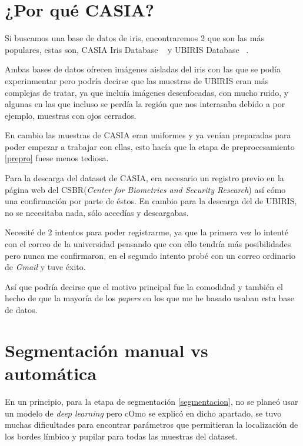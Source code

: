 
\section{¿Por qué CASIA?}

Si buscamos una base de datos de iris, encontraremos 2 que son las más populares, estas son, CASIA Iris Database ~\cite{casia:1} y UBIRIS Database ~\cite{ubiris:1}.

Ambas bases de datos ofrecen imágenes aisladas del iris con las que se podía experinmentar pero podría decirse que las muestras de UBIRIS eran más complejas de tratar, ya que incluía imágenes desenfocadas, con mucho ruido, y algunas en las que incluso se perdía la región que nos interasaba debido a por ejemplo, muestras con ojos cerrados.

En cambio las muestras de CASIA eran uniformes y ya venían preparadas para poder empezar a trabajar con ellas, esto hacía que la etapa de preprocesamiento \ref{prepro} fuese menos tediosa. 

Para la descarga del dataset de CASIA, era necesario un registro previo en la página web del CSBR(\emph{Center for Biometrics and Security Research}) así cómo una confirmación por parte de éstos.
En cambio para la descarga del de UBIRIS, no se necesitaba nada, sólo accedías y descargabas.

Necesité de 2 intentos para poder registrarme, ya que la primera vez lo intenté con el correo de la universidad pensando que con ello tendría más posibilidades pero nunca me confirmaron, en el segundo intento probé con un correo ordinario de \emph{Gmail} y tuve éxito.

Así que podría decirse que el motivo principal fue la comodidad y también el hecho de que la mayoría de los \emph{papers} en los que me he basado usaban esta base de datos.

\section{Segmentación manual vs automática}

En un principio, para la etapa de segmentación \ref{segmentacion}, no se planeó usar un modelo de \emph{deep learning} pero cOmo se explicó en dicho apartado, se tuvo muchas dificultades para encontrar parámetros que permitieran la localización de los bordes límbico y pupilar para todas las muestras del dataset.

